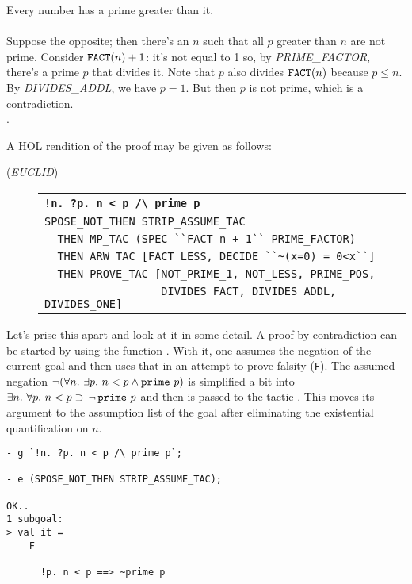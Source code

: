  Every number has a prime greater than it.\\
 \\
\noindent Suppose the opposite; then there's an $n$
such that all $p$ greater than $n$ are not prime. Consider $\mbox{\tt
FACT}(n) + 1$: it's not equal to 1 so, by {\small{\it PRIME\_FACTOR}},
there's a prime $p$ that divides it. Note that $p$ also divides
$\mbox{\tt FACT}(n)$ because $p \leq n$. By {\small{\it DIVIDES\_ADDL}},
we have $p=1$. But then $p$ is not prime, which is a contradiction. \\
.

A HOL rendition of the proof may be given as follows:
\begin{description}
\item [\small{({\it EUCLID\/})}]
\begin{tabular}[t]{l}
\verb+!n. ?p. n < p /\ prime p+ \\ \hline
\verb+SPOSE_NOT_THEN STRIP_ASSUME_TAC+ \\
\verb!  THEN MP_TAC (SPEC ``FACT n + 1`` PRIME_FACTOR)! \\
\verb+  THEN ARW_TAC [FACT_LESS, DECIDE ``~(x=0) = 0<x``]+ \\
\verb+  THEN PROVE_TAC [NOT_PRIME_1, NOT_LESS, PRIME_POS, + \\
\verb+                  DIVIDES_FACT, DIVIDES_ADDL, DIVIDES_ONE]+ \\
\end{tabular}
\end{description}
Let's prise this apart and look at it in some detail. A proof by
contradiction can be started by using the  function
. With it, one assumes the negation of the
current goal and then uses that in an attempt to prove falsity
(\verb+F+). The assumed negation $\neg(\forall n.\ \exists p.\ n < p
\land \mbox{\tt prime}\ p)$ is simplified a bit into $\exists n.\
\forall p.\ n < p \supset \, \neg \,\mbox{\tt prime}\ p$ and then is
passed to the tactic \ml{STRIP\_ASSUME\_TAC}. This moves its argument
to the assumption list of the goal after eliminating the existential
quantification on $n$.
\begin{session}\begin{verbatim}
- g `!n. ?p. n < p /\ prime p`;

- e (SPOSE_NOT_THEN STRIP_ASSUME_TAC);

OK..
1 subgoal:
> val it =
    F
    ------------------------------------
      !p. n < p ==> ~prime p
\end{verbatim}\end{session}
